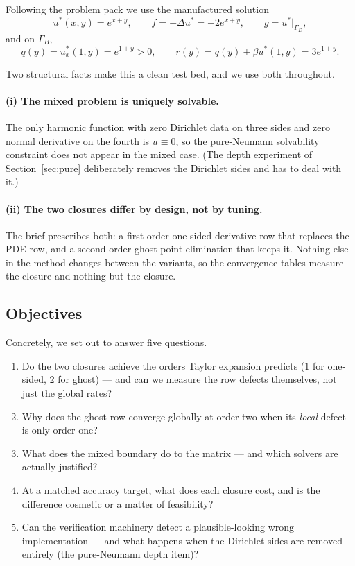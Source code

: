\documentclass[11pt,a4paper]{article}
\begin{document}
Following the problem pack we use the manufactured solution
\begin{equation}\label{eq:mms}
u^*(x,y) = e^{x+y},\qquad
f = -\Delta u^* = -2e^{x+y},\qquad
g = u^*|_{\Gamma_D},
\end{equation}
and on $\Gamma_B$,
\begin{equation}\label{eq:data}
q(y) = u^*_x(1,y) = e^{1+y} > 0,
\qquad
r(y) = q(y) + \beta u^*(1,y) = 3e^{1+y}.
\end{equation}

Two structural facts make this a clean test bed, and we use both throughout.

\paragraph{(i) The mixed problem is uniquely solvable.} The only harmonic
function with zero Dirichlet data on three sides and zero normal derivative
on the fourth is $u \equiv 0$, so the pure-Neumann solvability constraint
does not appear in the mixed case. (The depth experiment of
Section~\ref{sec:pure} deliberately removes the Dirichlet sides and has to
deal with it.)

\paragraph{(ii) The two closures differ by design, not by tuning.} The brief
prescribes both: a first-order one-sided derivative row that replaces the PDE
row, and a second-order ghost-point elimination that keeps it. Nothing else
in the method changes between the variants, so the convergence tables measure
the closure and nothing but the closure.

\subsection{Objectives}
\label{sec:objectives}
Concretely, we set out to answer five questions.
\begin{enumerate}[label=\textbf{Q\arabic*.}]
\item Do the two closures achieve the orders Taylor expansion predicts
      ($1$ for one-sided, $2$ for ghost) --- and can we measure the row
      defects themselves, not just the global rates?
\item Why does the ghost row converge globally at order two when its
      \emph{local} defect is only order one?
\item What does the mixed boundary do to the matrix --- and which solvers
      are actually justified?
\item At a matched accuracy target, what does each closure cost, and is the
      difference cosmetic or a matter of feasibility?
\item Can the verification machinery detect a plausible-looking wrong
      implementation --- and what happens when the Dirichlet sides are
      removed entirely (the pure-Neumann depth item)?
\end{enumerate}
\end{document}
